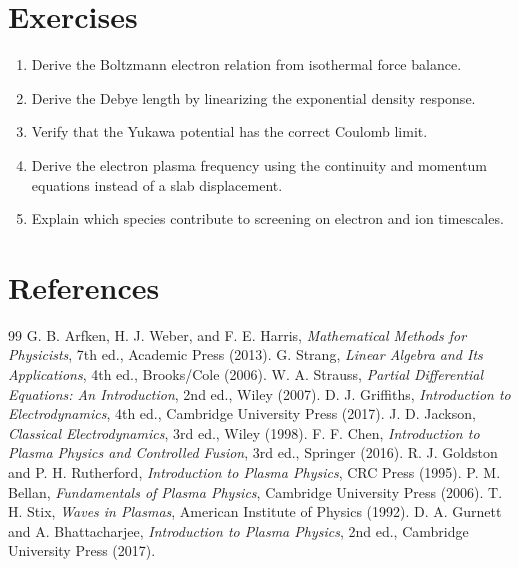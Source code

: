 \documentclass[11pt]{article}
\begin{document}
\section{Exercises}
\begin{enumerate}[leftmargin=1.8em]
\item Derive the Boltzmann electron relation from isothermal force balance.
\item Derive the Debye length by linearizing the exponential density response.
\item Verify that the Yukawa potential has the correct Coulomb limit.
\item Derive the electron plasma frequency using the continuity and momentum equations instead of a slab displacement.
\item Explain which species contribute to screening on electron and ion timescales.
\end{enumerate}

\section{References}
\begin{thebibliography}{99}
 G. B. Arfken, H. J. Weber, and F. E. Harris, \emph{Mathematical Methods for Physicists}, 7th ed., Academic Press (2013).
 G. Strang, \emph{Linear Algebra and Its Applications}, 4th ed., Brooks/Cole (2006).
 W. A. Strauss, \emph{Partial Differential Equations: An Introduction}, 2nd ed., Wiley (2007).
 D. J. Griffiths, \emph{Introduction to Electrodynamics}, 4th ed., Cambridge University Press (2017).
 J. D. Jackson, \emph{Classical Electrodynamics}, 3rd ed., Wiley (1998).
 F. F. Chen, \emph{Introduction to Plasma Physics and Controlled Fusion}, 3rd ed., Springer (2016).
 R. J. Goldston and P. H. Rutherford, \emph{Introduction to Plasma Physics}, CRC Press (1995).
 P. M. Bellan, \emph{Fundamentals of Plasma Physics}, Cambridge University Press (2006).
 T. H. Stix, \emph{Waves in Plasmas}, American Institute of Physics (1992).
 D. A. Gurnett and A. Bhattacharjee, \emph{Introduction to Plasma Physics}, 2nd ed., Cambridge University Press (2017).
\end{thebibliography}
\end{document}

